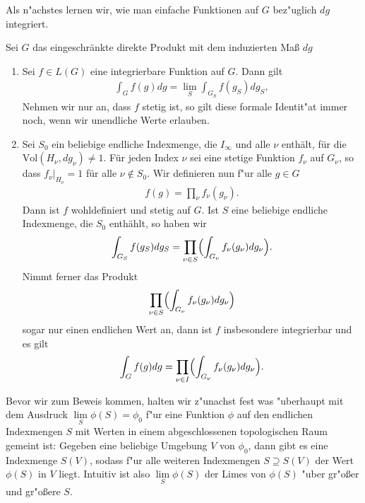 		Als n"achstes lernen wir, wie man einfache Funktionen auf $G$ bez"uglich $dg$ integriert.
		\begin{proposition}\label{prop:rdp:integrieren}
			Sei $G$ das eingeschränkte direkte Produkt mit dem induzierten Maß $dg$
			\begin{enumerate}[label=\emph{(\roman*)}]
				\item Sei $f \in L(G)$ eine integrierbare Funktion auf $G$. Dann gilt
					\begin{align*}
						\int_G f(g)dg = \lim_S \int_{G_S} f(g_S) dg_S,
					\end{align*}
					Nehmen wir nur an, dass $f$ stetig ist, so gilt diese formale Identit"at immer noch, wenn wir unendliche Werte erlauben.
				\item Sei $S_0$ ein beliebige endliche Indexmenge, die $I_\infty$ und alle $\nu$ enthält, für die $\text{Vol}(H_\nu, dg_\nu) \not= 1$. 
					Für jeden Index $\nu$ sei eine stetige Funktion $f_\nu$ auf $G_\nu$, so dass $f_\nu |_{H_\nu} = 1$ für alle $\nu \notin S_0$. 
					Wir definieren nun f"ur alle $g\in G$ 
					\begin{align*}
						f(g) = \prod_{\nu}f_\nu(g_\nu).
					\end{align*} 
					Dann ist $f$ wohldefiniert und stetig auf $G$. 
					Ist $S$ eine beliebige endliche Indexmenge, die $S_0$ enthählt, so haben wir
					\begin{align}\label{eq:satz:integration}
						\int_{G_S} f(g_S) dg_S = \prod_{\nu\in S}\Bigl(\int_{G_\nu} f_\nu (g_\nu)dg_\nu\Bigr).
					\end{align}
					Nimmt ferner das Produkt
					\begin{align*}
						\prod_{\nu\in S}\Bigl(\int_{G_\nu} f_\nu (g_\nu)dg_\nu\Bigr)
					\end{align*}
					sogar nur einen endlichen Wert an, dann ist $f$ insbesondere integrierbar und es gilt
					\begin{align*}
						\int_{G} f(g) dg = \prod_{\nu\in I}\Bigl(\int_{G_\nu} f_\nu (g_\nu)dg_\nu\Bigr).
					\end{align*}	
			\end{enumerate}
		\end{proposition}
		Bevor wir zum Beweis kommen, halten wir z"unachst fest was "uberhaupt mit dem Ausdruck $\lim\limits_S \phi(S) = \phi_0$ f"ur eine Funktion $\phi$ auf den endlichen Indexmengen $S$ mit Werten in einem abgeschlossenen topologischen Raum gemeint ist: Gegeben eine beliebige Umgebung $V$ von $\phi_0$, dann gibt es eine Indexmenge $S(V)$, sodass f"ur alle weiteren Indexmengen $S \supseteq S(V)$ der Wert $\phi(S)$ in $V$ liegt. Intuitiv ist also  $\lim\limits_S \phi(S)$ der Limes von $\phi(S)$ "uber gr"oßer und gr"oßere $S$.
			
